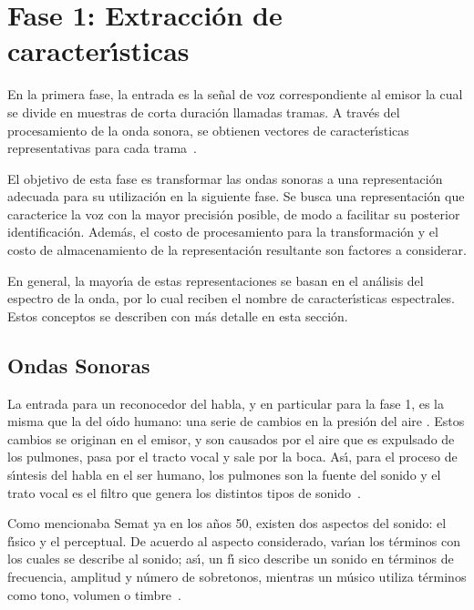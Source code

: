 \section{Fase 1: Extracci\'on de caracter{\'\i}sticas}
\label{sec:featureExtraction}

En la primera fase, la entrada es la se\~nal de voz correspondiente al emisor la cual se divide
en muestras de corta duraci\'on llamadas tramas. A trav\'es del procesamiento de la onda sonora, 
se obtienen vectores de caracter{\'\i}sticas representativas para cada \mbox{trama \cite{Jurafsky}.}

El objetivo de esta fase es transformar las ondas sonoras a una representaci\'on adecuada para 
su utilizaci\'on en la siguiente fase. Se busca una representaci\'on que caracterice la voz con 
la mayor precisi\'on posible, de modo a facilitar su posterior identificaci\'on. Adem\'as, 
el costo de procesamiento para la transformaci\'on y el costo de almacenamiento de la 
representaci\'on resultante son factores a considerar.

En general, la mayor{\'\i}a de estas representaciones se basan en el an\'alisis del espectro
de la onda, por lo cual reciben el nombre de caracter{\'\i}sticas espectrales. 
Estos conceptos se describen con m\'as detalle en esta secci\'on.

\subsection{Ondas Sonoras}

La entrada para un reconocedor del habla, y en particular para la fase 1, es la misma que 
la del o{\'\i}do humano: una serie de cambios en la presi\'on del aire \cite{YoungUniversity2007}. 
Estos cambios se originan en el emisor, y son causados por el aire que es expulsado de los pulmones,
pasa por el tracto vocal y sale por la boca. As{\'\i}, para el 
proceso de s{\'\i}ntesis del habla en el ser humano, los pulmones son la fuente
del sonido y el trato vocal es el filtro que genera los distintos tipos de \mbox{sonido \cite{BradburyLineal2000}}.

Como mencionaba Semat ya en los a\~nos 50, existen dos aspectos del sonido: el f{\'\i}sico y el 
perceptual. De acuerdo al 
aspecto considerado, var{\'\i}an los t\'erminos con los cuales se describe al sonido; as{\'\i}, un f{\'\i}
sico describe un sonido en t\'erminos de frecuencia, amplitud y n\'umero de sobretonos, mientras un 
m\'usico utiliza t\'erminos como tono, volumen o \mbox{timbre \cite{SematPhysics1958}}.

